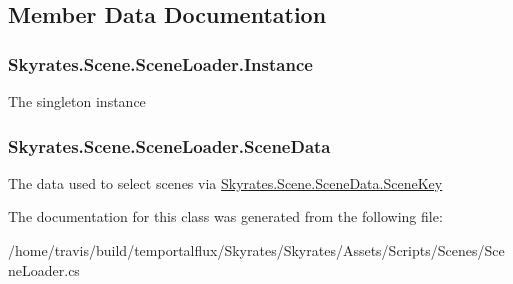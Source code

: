 \subsection{Member Data Documentation}
\hypertarget{class_skyrates_1_1_scene_1_1_scene_loader_a52720906743e769d4f9ac097a08f4fd7}{
\subsubsection[{Instance}]{ Skyrates.\-Scene.\-Scene\-Loader.\-Instance\hspace{0.3cm}{\ttfamily [static]}}}\label{class_skyrates_1_1_scene_1_1_scene_loader_a52720906743e769d4f9ac097a08f4fd7}


The singleton instance 

\hypertarget{class_skyrates_1_1_scene_1_1_scene_loader_aa189bbb8762d4dcabc228062f968c76f}{
\subsubsection[{Scene\-Data}]{ Skyrates.\-Scene.\-Scene\-Loader.\-Scene\-Data}}\label{class_skyrates_1_1_scene_1_1_scene_loader_aa189bbb8762d4dcabc228062f968c76f}


The data used to select scenes via \hyperlink{class_skyrates_1_1_scene_1_1_scene_data_a466c9423ed3d053f5513e19abcf76b75}{Skyrates.\-Scene.\-Scene\-Data.\-Scene\-Key} 



The documentation for this class was generated from the following file\-:\begin{DoxyCompactItemize}
\item 
/home/travis/build/temportalflux/\-Skyrates/\-Skyrates/\-Assets/\-Scripts/\-Scenes/Scene\-Loader.\-cs\end{DoxyCompactItemize}
